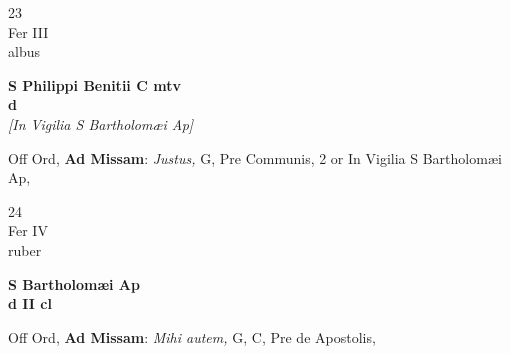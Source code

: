 \documentclass[10pt, openany]{book}
\begin{document}
        \begin{center}
            \begin{minipage}{3.5in}
                \vspace{2em}
                \begin{minipage}{0.5in}
                    {\Huge 23} \\
                    {\normalsize Fer III} \\
                    {\normalsize albus}
                \end{minipage}
                \begin{minipage}{3.0in}
                    \textbf{ \large S Philippi Benitii C mtv \\
                    \textnormal{\normalsize d}} \\ \textit{[In Vigilia S Bartholomæi Ap]} \\ 
                \end{minipage}
                \begin{justify}Off Ord, \textbf{Ad Missam}: \textit{Justus,} G, Pre Communis, 2 or In Vigilia S Bartholomæi Ap,  
                \end{justify}
            \end{minipage}
        \end{center}
    
        \begin{center}
            \begin{minipage}{3.5in}
                \vspace{2em}
                \begin{minipage}{0.5in}
                    {\Huge 24} \\
                    {\normalsize Fer IV} \\
                    {\normalsize ruber}
                \end{minipage}
                \begin{minipage}{3.0in}
                    \textbf{ \large S Bartholomæi Ap \\
                    \textnormal{\normalsize d II cl}} \\ 
                \end{minipage}
                \begin{justify}Off Ord, \textbf{Ad Missam}: \textit{Mihi autem,} G, C, Pre de Apostolis,  
                \end{justify}
            \end{minipage}
        \end{center}
    
\end{document}
